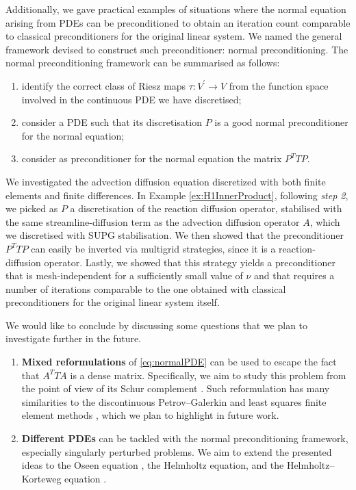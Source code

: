 \documentclass[hidelinks,onefignum,onetabnum]{siamart220329}
\newcommand{\bb}[1]{#1}
\begin{document}
Additionally, we gave practical examples of situations where the normal equation arising from PDEs can be preconditioned to obtain an iteration count comparable to classical preconditioners for the original linear system.  We named the general framework devised to construct such preconditioner: normal preconditioning.
The normal preconditioning framework can be summarised as follows:
\begin{enumerate}
    \item identify the correct class of Riesz maps $\tau:V^\prime\to V$ from the function space involved in the continuous PDE we have discretised;
    \item consider a PDE such that its discretisation $P$ is a good {normal preconditioner} for the normal equation;
    \item consider as preconditioner for the normal equation the matrix $P^TTP$.
\end{enumerate}
We investigated the advection diffusion equation discretized with both finite elements and finite differences.
In Example \ref{ex:H1InnerProduct}, following \textit{step 2}, we picked as $P$ a discretisation of the reaction diffusion operator, stabilised with the same streamline-diffusion term as the advection diffusion operator $A$, which we discretised with SUPG stabilisation.
We then showed that the preconditioner $P^TTP$ can easily be inverted via multigrid strategies, since it is a reaction-diffusion operator.
Lastly, we showed that this strategy yields a preconditioner that is mesh-independent for a sufficiently small value of $\nu$ and that requires a number of iterations comparable to the one obtained with classical preconditioners for the original linear system itself.

We would like to conclude by discussing some questions that we plan to investigate further in the future.
\begin{enumerate}
    \item \textbf{Mixed reformulations} of \eqref{eq:normalPDE} can be used to escape the fact that $A^TTA$ is a dense matrix. Specifically, we aim to study this problem from the point of view of its Schur complement \cite{Wathen}. Such reformulation has many similarities to the discontinuous Petrov--Galerkin and least squares finite element methods \cite{Demkowicz, Ita,Bochev}, which we plan to highlight in future work.
    \item \textbf{Different PDEs} can be tackled with the normal preconditioning framework, especially singularly perturbed problems. We aim to extend the presented ideas to the Oseen equation \cite{Elman}, the Helmholtz equation, and the \bb{Helmholtz}--Korteweg equation \cite{Farrell2}.
\end{enumerate}
\end{document}
